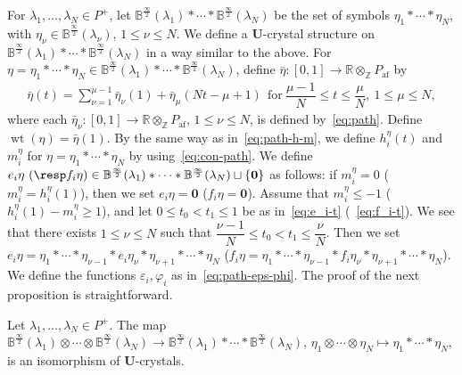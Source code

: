 \documentclass[ALCO,ThmDefs,Unicode,epreuves]{cedram}
\newcommand{\BR}{\mathbb{R}}
\newcommand{\BZ}{\mathbb{Z}}
\newcommand\bm[1]{\boldsymbol{#1}}
\renewcommand{\U}{\mathbf{U}}
\newcommand{\si}{\frac{\infty}{2}}
\DeclareMathOperator{\af}{af}
\DeclareMathOperator{\wt}{wt}
\begin{document}
For 
$\lambda_1 , \ldots , \lambda_N \in P^+$, 
let 
$\mathbb{B}^{\si}(\lambda_1) * \cdots * \mathbb{B}^{\si}(\lambda_N)$
be the set of symbols
$\eta_1 * \cdots * \eta_N$, 
with 
$\eta_{\nu} \in \mathbb{B}^{\si}(\lambda_{\nu})$, 
$1 \leq \nu \leq N$. 
We define a $\U$-crystal structure on 
$\mathbb{B}^{\si}(\lambda_1) * \cdots * \mathbb{B}^{\si}(\lambda_N)$
in a way similar to the above. For 
$\eta = \eta_1 * \cdots * \eta_N \in \mathbb{B}^{\si}(\lambda_1) * \cdots * \mathbb{B}^{\si}(\lambda_N)$, 
define 
$\bar{\eta} : [0,1] \rightarrow \BR \otimes_{\BZ} P_{\af}$ 
by
\begin{align} \label{eq:con-path}
\bar{\eta} (t) = 
\sum_{\nu = 1}^{\mu - 1} \bar{\eta}_{\nu}(1) + \bar{\eta}_{\mu}(Nt - \mu + 1) 
\ \ 
\text{for} \ 
\dfrac{\mu - 1}{N} \leq t \leq \dfrac{\mu}{N}, \ 
1 \leq \mu \leq N,
\end{align}
where each 
$\bar{\eta}_{\nu} : [0,1] \rightarrow \BR \otimes_{\BZ} P_{\af}$, $1 \leq \nu \leq N$, 
is defined by~\eqref{eq:path}. 
Define 
$\wt (\eta) = \bar{\eta}(1)$. 
By the same way as in~\eqref{eq:path-h-m}, 
we define 
$h_i^{\eta}(t)$ 
and 
$m_i^{\eta}$
for 
$\eta = \eta_1 * \cdots * \eta_N$ 
by using~\eqref{eq:con-path}. 
We define 
$e_i \eta \ (\resp f_i \eta) \in \mathbb{B}^{\si}(\lambda_1) * \cdots * \mathbb{B}^{\si}(\lambda_N) \sqcup \{ \bm{0} \}$ 
as follows: 
if $m_i^{\eta} = 0$ (\resp $m_i^{\eta} = h_i^{\eta} (1) $), then we set $e_i \eta = \bm{0}$ (\resp $f_i \eta = \bm{0}$). 
Assume that 
$m_i^{\eta} \leq -1$ 
(\resp $h_i^{\eta} (1) - m_i^{\eta} \geq 1$), 
and let 
$0 \leq t_0 < t_1 \leq 1$ 
be as in~\eqref{eq:e_i-t} (\resp~\eqref{eq:f_i-t}). 
We see that there exists $1 \leq \nu \leq N$ such that 
$\dfrac{\nu -1}{N} \leq t_0 < t_1 \leq \dfrac{\nu}{N}$. 
Then we set 
$e_i \eta = \eta_1 * \cdots * \eta_{\nu -1} * e_i \eta_{\nu} * \eta_{\nu + 1} * \cdots * \eta_N$ 
(\resp $f_i \eta = \eta_1 * \cdots * \eta_{\nu -1} * f_i \eta_{\nu} * \eta_{\nu + 1} * \cdots * \eta_N$).
We define the functions 
$\varepsilon_i , \varphi_i$ 
as in~\eqref{eq:path-eps-phi}. 
The proof of the next proposition is straightforward.

\begin{prop} \label{prop:conc=tensor}
Let 
$\lambda_1 , \ldots , \lambda_N \in P^+$. 
The map 
$\mathbb{B}^{\si}(\lambda_1) \otimes \cdots \otimes \mathbb{B}^{\si}(\lambda_N)
\rightarrow 
\mathbb{B}^{\si}(\lambda_1) * \cdots * \mathbb{B}^{\si}(\lambda_N)$, 
$\eta_1 \otimes \cdots \otimes \eta_N \mapsto \eta_1 * \cdots * \eta_N$, 
is an isomorphism of $\U$-crystals.
\end{prop}
\end{document}

